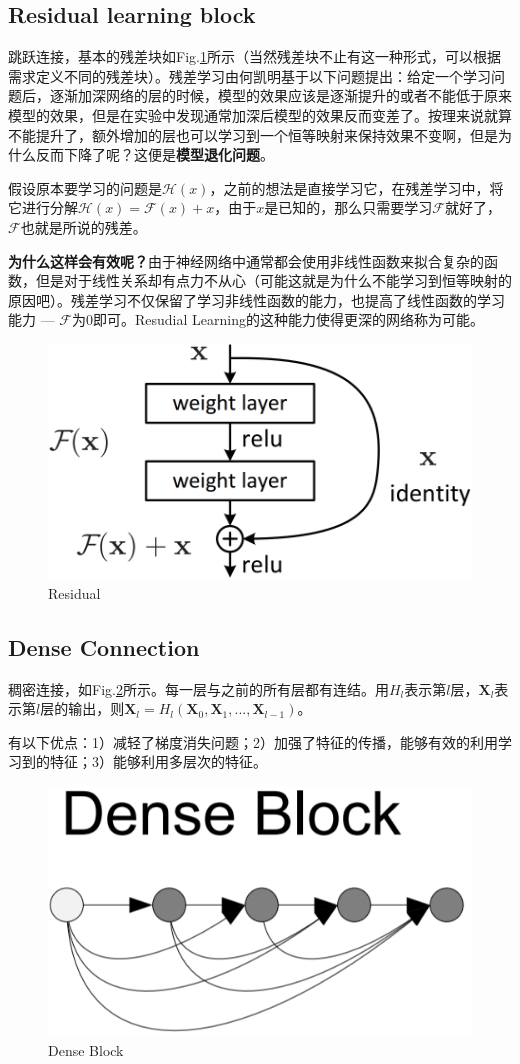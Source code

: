 \subsection{Residual learning block}
跳跃连接，基本的残差块如Fig.\ref{fig:residual}所示（当然残差块不止有这一种形式，可以根据需求定义不同的残差块）。残差学习由何凯明基于以下问题提出：给定一个学习问题后，逐渐加深网络的层的时候，模型的效果应该是逐渐提升的或者不能低于原来模型的效果，但是在实验中发现通常加深后模型的效果反而变差了。按理来说就算不能提升了，额外增加的层也可以学习到一个恒等映射来保持效果不变啊，但是为什么反而下降了呢？这便是\textbf{模型退化问题}。

假设原本要学习的问题是$\mathcal{H}(x)$，之前的想法是直接学习它，在残差学习中，将它进行分解$\mathcal{H}(x) = \mathcal{F}(x) + x$，由于$x$是已知的，那么只需要学习$\mathcal{F}$就好了，$\mathcal{F}$也就是所说的残差。

\textbf{为什么这样会有效呢？}由于神经网络中通常都会使用非线性函数来拟合复杂的函数，但是对于线性关系却有点力不从心（可能这就是为什么不能学习到恒等映射的原因吧）。残差学习不仅保留了学习非线性函数的能力，也提高了线性函数的学习能力 --- $\mathcal{F}$为0即可。Resudial Learning的这种能力使得更深的网络称为可能。

\begin{figure}[h]
	\centering
	\includegraphics[width=.4\textwidth]{pics/Residual.png}
	\caption{Residual}
	\label{fig:residual}
\end{figure}

\subsection{Dense Connection}
稠密连接，如Fig.\ref{fig:dense block}所示。每一层与之前的所有层都有连结。用$H_l$表示第$l$层，$\boldsymbol{X}_l$表示第$l$层的输出，则$\boldsymbol{X}_l = H_l(\boldsymbol{X}_0, \boldsymbol{X}_1, ..., \boldsymbol{X}_{l-1})$。

有以下优点：1）减轻了梯度消失问题；2）加强了特征的传播，能够有效的利用学习到的特征；3）能够利用多层次的特征。
\begin{figure}[h]
	\centering
	\includegraphics[width=.4\textwidth]{pics/dense block.png}
	\caption{Dense Block}
	\label{fig:dense block}
\end{figure}

